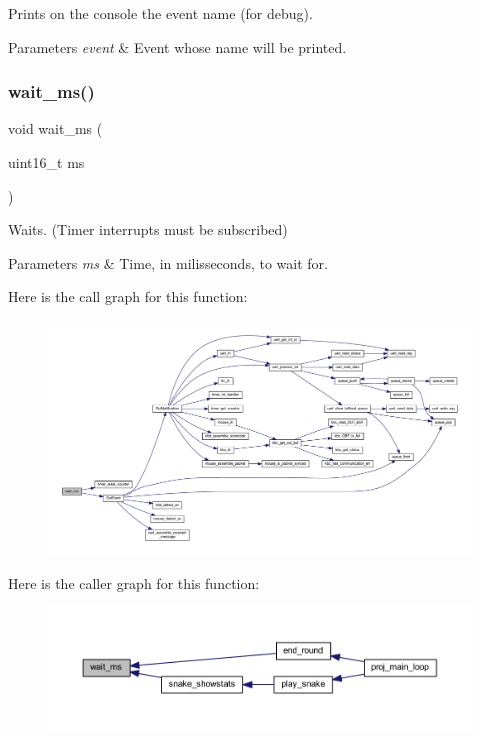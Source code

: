 Prints on the console the event name (for debug). 


\begin{DoxyParams}{Parameters}
{\em event} & Event whose name will be printed. \\
\hline
\end{DoxyParams}
\mbox{\label{group__event_ga4e73585bc921a75ae4b4cac67b718d67}} 
\subsubsection{\texorpdfstring{wait\+\_\+ms()}{wait\_ms()}}
{\footnotesize\ttfamily void wait\+\_\+ms (\begin{DoxyParamCaption}\item[{uint16\+\_\+t}]{ms }\end{DoxyParamCaption})}



Waits. (Timer interrupts must be subscribed) 


\begin{DoxyParams}{Parameters}
{\em ms} & Time, in milisseconds, to wait for. \\
\hline
\end{DoxyParams}
Here is the call graph for this function\+:
\nopagebreak
\begin{figure}[H]
\begin{center}
\leavevmode
\includegraphics[width=350pt]{group__event_ga4e73585bc921a75ae4b4cac67b718d67_cgraph}
\end{center}
\end{figure}
Here is the caller graph for this function\+:\nopagebreak
\begin{figure}[H]
\begin{center}
\leavevmode
\includegraphics[width=350pt]{group__event_ga4e73585bc921a75ae4b4cac67b718d67_icgraph}
\end{center}
\end{figure}


